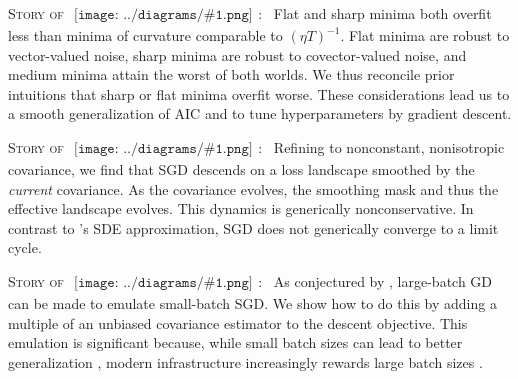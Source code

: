 \documentclass{article}
\theoremstyle{plain}
\theoremstyle{definition}
\newcommand{\sdia}[1]{\begin{gathered}\texttt{[image: ../diagrams/\#1.png]}\end{gathered}}
\begin{document}
        \textsc{Story of $\sdia{c(01-2)(02-12)}$:~}
        Flat and sharp minima both overfit less than minima of curvature
        comparable to $(\eta T)^{-1}$.  Flat minima are robust to
        vector-valued noise, sharp minima are robust to
        covector-valued noise, and medium minima attain the worst of both
        worlds.  We thus reconcile prior intuitions that sharp \citep{ ke17,
        wa18} or flat \citep{di17, wu18} minima overfit worse.  These
        considerations lead us to a smooth generalization of AIC and to tune
        hyperparameters by gradient descent.

        \textsc{Story of $\sdia{c(01-2-3)(02-12-23)}$:~}
        Refining \citet{we19b} to nonconstant, nonisotropic covariance, we find
        that SGD descends on a loss landscape smoothed by the \emph{current}
        covariance.  As the covariance evolves, the smoothing mask and thus the
        effective landscape evolves.  This dynamics is generically
        nonconservative.  In contrast to \citet{ch18}'s SDE approximation,
        SGD does not generically converge to a limit cycle. 

        \textsc{Story of $\sdia{c(01-2)(01-12)}$:~}
        As conjectured by \citet{ro18}, large-batch GD can be made to emulate
        small-batch SGD.  We show how to do this by adding a multiple of an
        unbiased covariance estimator to the descent objective.  This emulation
        is significant because, while small batch sizes can lead to better
        generalization \citep{bo91}, modern infrastructure increasingly rewards
        large batch sizes \citep{go18}.  

\end{document}

